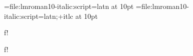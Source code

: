 
\font\testa={file:lmroman10-italic:script=latn}       at 10pt
\font\testb={file:lmroman10-italic:script=latn;+itlc} at 10pt

{\testa f\/}!\par
{\testb f\/}!\par
\bye
